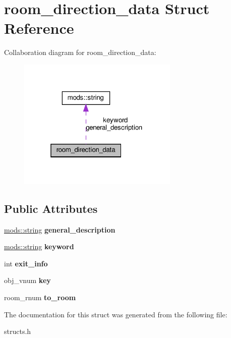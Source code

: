 \hypertarget{structroom__direction__data}{}\section{room\+\_\+direction\+\_\+data Struct Reference}
\label{structroom__direction__data}


Collaboration diagram for room\+\_\+direction\+\_\+data\+:
\nopagebreak
\begin{figure}[H]
\begin{center}
\leavevmode
\includegraphics[width=217pt]{structroom__direction__data__coll__graph}
\end{center}
\end{figure}
\subsection*{Public Attributes}
\begin{DoxyCompactItemize}
\item 
\mbox{\label{structroom__direction__data_a5ccc990bafbd9b5ba8c0fbee5c15a3a9}} 
\hyperlink{structmods_1_1string}{mods\+::string} {\bfseries general\+\_\+description}
\item 
\mbox{\label{structroom__direction__data_aa788254813864106c781808a382e6c37}} 
\hyperlink{structmods_1_1string}{mods\+::string} {\bfseries keyword}
\item 
\mbox{\label{structroom__direction__data_ad4e0b315a7b257e243a46493c820e690}} 
int {\bfseries exit\+\_\+info}
\item 
\mbox{\label{structroom__direction__data_a8eafc6e176dd09ac2e6ecc568c6261f8}} 
obj\+\_\+vnum {\bfseries key}
\item 
\mbox{\label{structroom__direction__data_a91f22f34abae70aed980bdffd6b50810}} 
room\+\_\+rnum {\bfseries to\+\_\+room}
\end{DoxyCompactItemize}


The documentation for this struct was generated from the following file\+:\begin{DoxyCompactItemize}
\item 
structs.\+h\end{DoxyCompactItemize}
